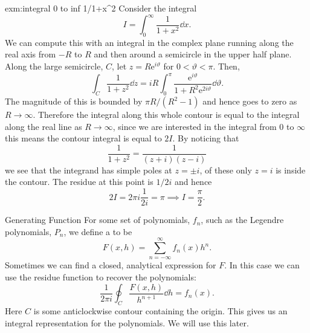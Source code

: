 \documentclass[fleqn]{NotesClass}
\newcommand*{\e}{\mathrm{e}}
\begin{document}
    \begin{exm}{}{exm:integral 0 to inf 1/1+x^2}
        Consider the integral
        \begin{equation}
            I = \int_0^{\infty} \frac{1}{1 + x^2}\dd{x}.
        \end{equation}
        We can compute this with an integral in the complex plane running along the real axis from \(-R\) to \(R\) and then around a semicircle in the upper half plane.
        Along the large semicircle, \(C\), let \(z = R\e^{i\vartheta}\) for \(0 < \vartheta < \pi\).
        Then,
        \begin{equation}
            \int_C \frac{1}{1 + z^2} \dd{z} = iR\int_0^\pi \frac{\e^{i\vartheta}}{1 + R^2\e^{2i\vartheta}} \dd{\vartheta}.
        \end{equation}
        The magnitude of this is bounded by \(\pi R/(R^2 - 1)\) and hence goes to zero as \(R \to \infty\).
        Therefore the integral along this whole contour is equal to the integral along the real line as \(R \to \infty\), since we are interested in the integral from 0 to \(\infty\) this means the contour integral is equal to \(2I\).
        By noticing that
        \begin{equation}
            \frac{1}{1 + z^2} = \frac{1}{(z + i)(z - i)}
        \end{equation}
        we see that the integrand has simple poles at \(z = \pm i\), of these only \(z = i\) is inside the contour.
        The residue at this point is \(1/2i\) and hence
        \begin{equation}
            2I = 2\pi i\frac{1}{2i} = \pi \implies I = \frac{\pi}{2}.
        \end{equation}
    \end{exm}
    
    \begin{exm}{Generating Function}{}
        For some set of polynomials, \(f_n\), such as the Legendre polynomials, \(P_n\), we define a  to be
        \begin{equation}
            F(x, h) = \sum_{n=-\infty}^{\infty} f_n(x)h^n.
        \end{equation}
        Sometimes we can find a closed, analytical expression for \(F\).
        In this case we can use the residue function to recover the polynomials:
        \begin{equation}
            \frac{1}{2\pi i} \oint_C \frac{F(x, h)}{h^{n+1}}\dd{h} = f_n(x).
        \end{equation}
        Here \(C\) is some anticlockwise contour containing the origin.
        This gives us an integral representation for the polynomials.
        We will use this later.
    \end{exm}
    
\end{document}
